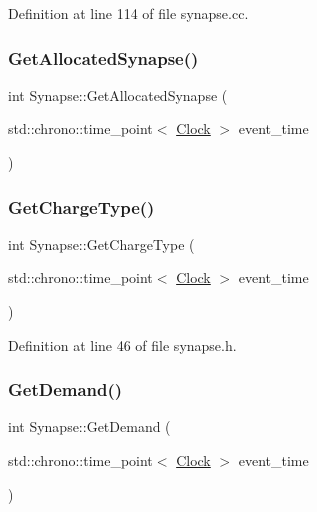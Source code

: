 Definition at line 114 of file synapse.\+cc.

\mbox{\label{class_synapse_ad9a7225ede0ce4f64ecea9bc9cb49e20}} 
\subsubsection{\texorpdfstring{Get\+Allocated\+Synapse()}{GetAllocatedSynapse()}}
{\footnotesize\ttfamily int Synapse\+::\+Get\+Allocated\+Synapse (\begin{DoxyParamCaption}\item[{std\+::chrono\+::time\+\_\+point$<$ \mbox{\hyperlink{universe_8h_a0ef8d951d1ca5ab3cfaf7ab4c7a6fd80}{Clock}} $>$}]{event\+\_\+time }\end{DoxyParamCaption})}

\mbox{\label{class_synapse_a1390c9fed5c01e712797818af1305ec0}} 
\subsubsection{\texorpdfstring{Get\+Charge\+Type()}{GetChargeType()}}
{\footnotesize\ttfamily int Synapse\+::\+Get\+Charge\+Type (\begin{DoxyParamCaption}\item[{std\+::chrono\+::time\+\_\+point$<$ \mbox{\hyperlink{universe_8h_a0ef8d951d1ca5ab3cfaf7ab4c7a6fd80}{Clock}} $>$}]{event\+\_\+time }\end{DoxyParamCaption})\hspace{0.3cm}{\ttfamily [inline]}}



Definition at line 46 of file synapse.\+h.

\mbox{\label{class_synapse_a6d4d63e445961c62f71eaf0da1c2848b}} 
\subsubsection{\texorpdfstring{Get\+Demand()}{GetDemand()}}
{\footnotesize\ttfamily int Synapse\+::\+Get\+Demand (\begin{DoxyParamCaption}\item[{std\+::chrono\+::time\+\_\+point$<$ \mbox{\hyperlink{universe_8h_a0ef8d951d1ca5ab3cfaf7ab4c7a6fd80}{Clock}} $>$}]{event\+\_\+time }\end{DoxyParamCaption})}




